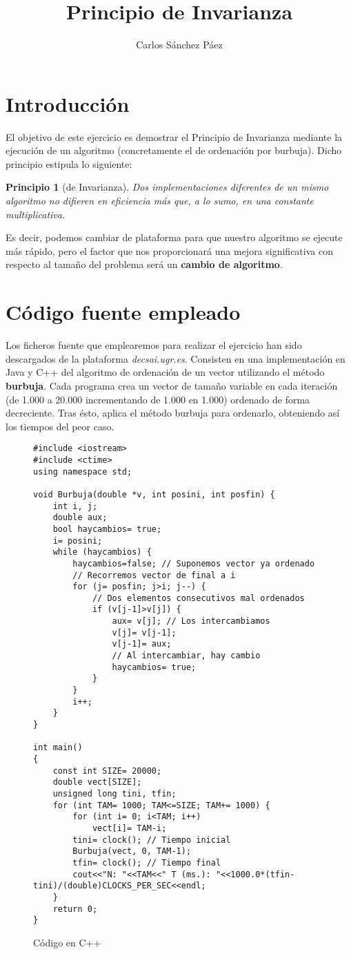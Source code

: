 \documentclass{article}
\newtheorem{ppio}{Principio }
\begin{document}
\title{Principio de Invarianza}
\author{Carlos Sánchez Páez}
\maketitle
\newpage

\section{Introducción}
El objetivo de este ejercicio es demostrar el Principio de Invarianza mediante la ejecución de un algoritmo (concretamente el de ordenación por burbuja). Dicho principio estipula lo siguiente: 
\begin{ppio}[de Invarianza]
Dos implementaciones diferentes de un  mismo  algoritmo  no  difieren  en  eficiencia  más  que,  a  lo  sumo,  en  una constante multiplicativa.
\end{ppio}
Es decir, podemos cambiar de plataforma para que nuestro algoritmo se ejecute más rápido, pero el factor que nos proporcionará una mejora significativa con respecto al tamaño del problema será un \textbf{cambio de algoritmo}. 
\section{Código fuente empleado}
Los ficheros fuente que emplearemos para realizar el ejercicio han sido descargados de la plataforma \textit{decsai.ugr.es}. Consisten en una implementación en Java y C++ del algoritmo de ordenación de un vector utilizando el método \textbf{burbuja}. 
\newline
Cada programa crea un vector de tamaño variable en cada iteración (de 1.000 a 20.000 incrementando de 1.000 en 1.000) ordenado de forma decreciente. Tras ésto, aplica el método burbuja para ordenarlo, obteniendo así los tiempos del peor caso.

\begin{figure}[H]
\begin{verbatim}
#include <iostream>
#include <ctime>
using namespace std;

void Burbuja(double *v, int posini, int posfin) {
    int i, j;
    double aux;
    bool haycambios= true;
    i= posini;
    while (haycambios) {
        haycambios=false; // Suponemos vector ya ordenado
        // Recorremos vector de final a i
        for (j= posfin; j>i; j--) {
            // Dos elementos consecutivos mal ordenados
            if (v[j-1]>v[j]) {
                aux= v[j]; // Los intercambiamos
                v[j]= v[j-1];
                v[j-1]= aux;
                // Al intercambiar, hay cambio
                haycambios= true;
            }
        }
        i++;
	}
}

int main()
{
    const int SIZE= 20000;
    double vect[SIZE];
    unsigned long tini, tfin;
    for (int TAM= 1000; TAM<=SIZE; TAM+= 1000) {
        for (int i= 0; i<TAM; i++)
            vect[i]= TAM-i;     
        tini= clock(); // Tiempo inicial
        Burbuja(vect, 0, TAM-1);
        tfin= clock(); // Tiempo final
        cout<<"N: "<<TAM<<" T (ms.): "<<1000.0*(tfin-tini)/(double)CLOCKS_PER_SEC<<endl;
    }
    return 0;
}
\end{verbatim}
\caption{Código en C++}
\end{figure}
\end{document}
